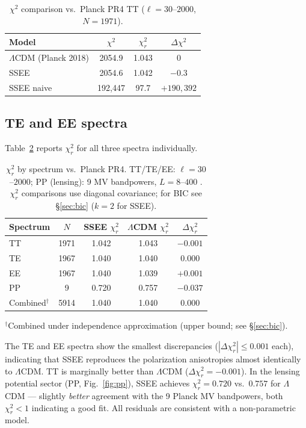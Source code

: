 \documentclass[12pt,a4paper]{article}
\begin{document}
\begin{table}[ht]
\centering
\caption{$\chi^2$ comparison vs.\ Planck PR4 TT ($\ell=30$--$2000$, $N=1971$).}
\label{tab:chi2}
\begin{tabular}{lccc}
\toprule
Model & $\chi^2$ & $\chi^2_r$ & $\Delta\chi^2$ \\
\midrule
$\Lambda$CDM (Planck 2018) & 2054.9 & 1.043 & 0 \\
SSEE & 2054.6 & 1.042 & $-0.3$ \\
SSEE naive & 192{,}447 & 97.7 & $+190{,}392$ \\
\bottomrule
\end{tabular}
\end{table}

\subsection{TE and EE spectra}

Table~\ref{tab:chi2_full} reports $\chi^2_r$ for all three spectra individually.

\begin{table}[ht]
\centering
\caption{$\chi^2_r$ by spectrum vs.\ Planck PR4.
TT/TE/EE: $\ell=30$--$2000$; PP (lensing): 9 MV bandpowers, $L=8$--$400$
\citep[Table~1,][]{PlanckLensing2018}.
$\chi^2_r$ comparisons use diagonal covariance; for BIC see \S\ref{sec:bic} ($k=2$ for SSEE).}
\label{tab:chi2_full}
\begin{tabular}{lcccc}
\toprule
Spectrum & $N$ & SSEE $\chi^2_r$ & $\Lambda$CDM $\chi^2_r$ & $\Delta\chi^2_r$ \\
\midrule
TT & 1971 & 1.042 & 1.043 & $-0.001$ \\
TE & 1967 & 1.040 & 1.040 & $0.000$ \\
EE & 1967 & 1.040 & 1.039 & $+0.001$ \\
PP & 9    & 0.720 & 0.757 & $-0.037$ \\
\midrule
Combined$^{\dagger}$ & 5914 & 1.040 & 1.040 & $0.000$ \\
\bottomrule
\end{tabular}
{\footnotesize $^{\dagger}$Combined under independence approximation (upper bound; see \S\ref{sec:bic}).}
\end{table}

The TE and EE spectra show the smallest discrepancies ($|\Delta\chi^2_r|\le0.001$
each), indicating that SSEE reproduces the polarization anisotropies
almost identically to $\Lambda$CDM.
TT is marginally better than $\Lambda$CDM ($\Delta\chi^2_r=-0.001$).
In the lensing potential sector (PP, Fig.~\ref{fig:pp}), SSEE achieves
$\chi^2_r=0.720$ vs.\ $0.757$ for $\Lambda$CDM --- slightly \emph{better} agreement
with the 9 Planck MV bandpowers, both $\chi^2_r<1$ indicating a good fit.
All residuals are consistent with a non-parametric model.
\end{document}
